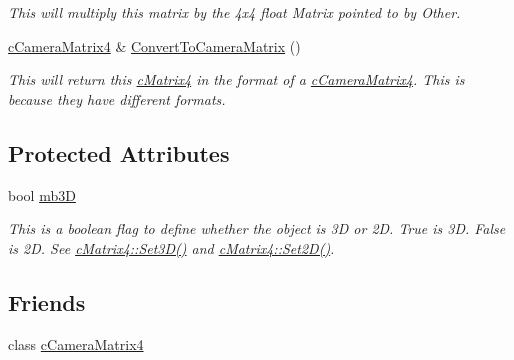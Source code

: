 \begin{DoxyCompactItemize}
\begin{DoxyCompactList}\small\item\em This will multiply this matrix by the 4x4 float Matrix pointed to by Other. \end{DoxyCompactList}\item 
\hypertarget{classc_matrix4_ac6bb495542c08395c26fd412db13a959}{
\hyperlink{classc_camera_matrix4}{cCameraMatrix4} \& \hyperlink{classc_matrix4_ac6bb495542c08395c26fd412db13a959}{ConvertToCameraMatrix} ()}
\label{classc_matrix4_ac6bb495542c08395c26fd412db13a959}

\begin{DoxyCompactList}\small\item\em This will return this \hyperlink{classc_matrix4}{cMatrix4} in the format of a \hyperlink{classc_camera_matrix4}{cCameraMatrix4}. This is because they have different formats. \end{DoxyCompactList}\end{DoxyCompactItemize}
\subsection*{Protected Attributes}
\begin{DoxyCompactItemize}
\item 
\hypertarget{classc_matrix4_ac0ebba0d10d97c6657dccd1575f761ab}{
bool \hyperlink{classc_matrix4_ac0ebba0d10d97c6657dccd1575f761ab}{mb3D}}
\label{classc_matrix4_ac0ebba0d10d97c6657dccd1575f761ab}

\begin{DoxyCompactList}\small\item\em This is a boolean flag to define whether the object is 3D or 2D. True is 3D. False is 2D. See \hyperlink{classc_matrix4_a746ce09337cbf6a3292cbe15991efd79}{cMatrix4::Set3D()} and \hyperlink{classc_matrix4_ad24236403317622459c3309938be9d21}{cMatrix4::Set2D()}. \end{DoxyCompactList}\end{DoxyCompactItemize}
\subsection*{Friends}
\begin{DoxyCompactItemize}
\item 
\hypertarget{classc_matrix4_ad892cad8874ae954d2e9de55b17ded93}{
class \hyperlink{classc_matrix4_ad892cad8874ae954d2e9de55b17ded93}{cCameraMatrix4}}
\label{classc_matrix4_ad892cad8874ae954d2e9de55b17ded93}

\end{DoxyCompactItemize}



